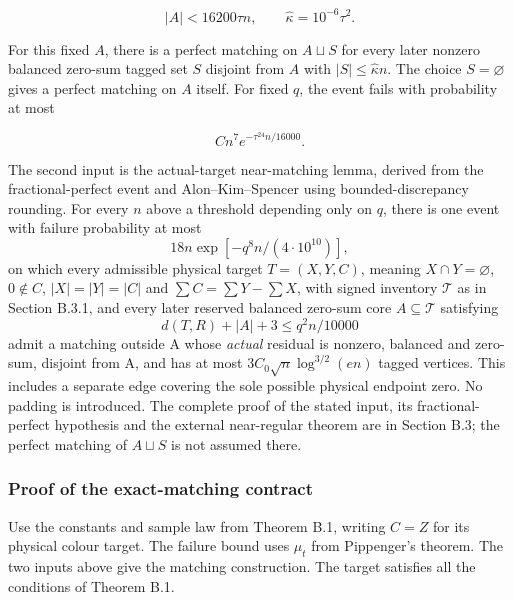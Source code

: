 \documentclass[11pt,a4paper]{article}
\begin{document}
\begin{equation}
|A|<16200\tau n,\qquad
 \widehat\kappa=10^{-6}\tau^2.
\tag{EM1}\label{eq:EM1}
\end{equation}

For this fixed \(A\), there is a perfect matching on \(A\sqcup S\) for every later nonzero balanced zero-sum tagged set \(S\) disjoint from \(A\) with \(|S|\le\widehat\kappa n\). The choice \(S=\varnothing\) gives a perfect matching on \(A\) itself. For fixed \(q\), the event fails with probability at most

\begin{equation}
Cn^7e^{-\tau^{24}n/16000}.
\tag{EM2}\label{eq:EM2}
\end{equation}

The second input is the actual-target near-matching lemma, derived from the fractional-perfect event and Alon--Kim--Spencer using bounded-discrepancy rounding. For every \(n\) above a threshold depending only on \(q\), there is one event with failure probability at most \begin{equation}
18n\exp[-q^8n/(4\cdot10^{10})],
\tag{EM3}\label{eq:EM3}
\end{equation} on which every admissible physical target \(T=(X,Y,C)\), meaning \(X\cap Y=\varnothing\), \(0\notin C\), \(|X|=|Y|=|C|\) and \(\sum C=\sum Y-\sum X\), with signed inventory \(\mathcal T\) as in Section B.3.1, and every later reserved balanced zero-sum core \(A\subseteq\mathcal T\) satisfying \begin{equation}
d(T,R)+|A|+3\le q^2n/10000
\tag{EM4}\label{eq:EM4}
\end{equation} admit a matching outside A whose \emph{actual} residual is nonzero, balanced and zero-sum, disjoint from A, and has at most \(3C_0\sqrt n \log^{3/2}(en)\) tagged vertices. This includes a separate edge covering the sole possible physical endpoint zero. No padding is introduced. The complete proof of the stated input, its fractional-perfect hypothesis and the external near-regular theorem are in Section B.3; the perfect matching of \(A\sqcup S\) is not assumed there.

\hypertarget{proof-of-the-exact-matching-contract}{%
\subsubsection{Proof of the exact-matching contract}\label{proof-of-the-exact-matching-contract}}

Use the constants and sample law from Theorem B.1, writing \(C=Z\) for its physical colour target. The failure bound uses \(\mu_t\) from Pippenger's theorem. The two inputs above give the matching construction. The target satisfies all the conditions of Theorem B.1.
\end{document}
